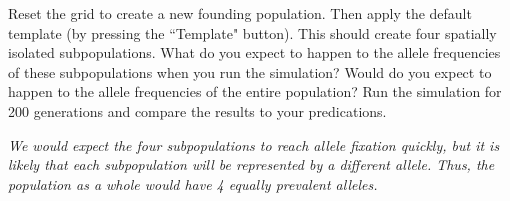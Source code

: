 \documentclass[12pt]{article}
\begin{document}
\begin{spacing}{1.5}
\begin{enumerate}
\par Reset the grid to create a new founding population. Then apply the default template (by pressing the ``Template" button). This should create four spatially isolated subpopulations. What do you expect to happen to the allele frequencies of these subpopulations when you run the simulation? Would do you expect to happen to the allele frequencies of the entire population? Run the simulation for 200 generations and compare the results to your predications.
\par \textit{We would expect the four subpopulations to reach allele fixation quickly, but it is likely that each subpopulation will be represented by a different allele. Thus, the population as a whole would have 4 equally prevalent alleles.}
\end{enumerate}


\end{spacing}
\end{document}
